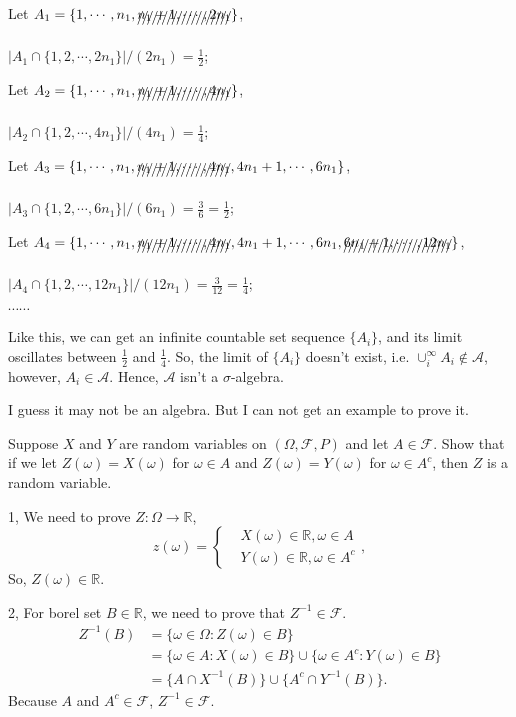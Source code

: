 \documentclass[en, normal, 11pt, black]{elegantnote}
\newenvironment{exercise}[1]{\begin{tcolorbox}[colback=black!15, colframe=black!80, breakable, title=#1]}{\end{tcolorbox}}
\renewenvironment{proof}{\begin{tcolorbox}[colback=white, colframe=black!50, breakable, title=Proof. ]\setlength{\parskip}{0.8em}}{\\\rightline{$\square$}\end{tcolorbox}}
\newenvironment{solution}{\begin{tcolorbox}[colback=white, colframe=black!50, breakable, title=Solution. ]\setlength{\parskip}{0.8em}}{\end{tcolorbox}}
\begin{document}
    \begin{solution}
        Let $A_1=\{1,\cdots,n_1, \xout{n_1+1, \cdots, 2n_1}\}$, 
        
        $|A_1 \cap\{1,2, \cdots, 2n_1\}| / (2n_1)=\frac{1}{2}$; 
        
        Let $A_2=\{1,\cdots,n_1,\xout{n_1+1, \cdots, 4n_1}\}$, 
        
        $|A_2 \cap\{1,2, \cdots, 4n_1\}| / (4n_1)=\frac{1}{4}$; 

        Let $A_3=\{1,\cdots,n_1,\xout{n_1+1, \cdots, 4n_1}, 4n_1+1, \cdots, 6n_1\}$, 
        
        $|A_3 \cap\{1,2, \cdots, 6n_1\}| / (6n_1)=\frac{3}{6}=\frac{1}{2}$; 

        Let $A_4=\{1,\cdots,n_1,\xout{n_1+1, \cdots, 4n_1}, 4n_1+1, \cdots, 6n_1,\xout{6n_1+1, \cdots, 12n_1}\}$, 
        
        $|A_4 \cap\{1,2, \cdots, 12n_1\}| / (12n_1)=\frac{3}{12}=\frac{1}{4}$; 

        $\cdots\cdots$

        Like this, we can get an infinite countable set sequence $\{A_i\}$, and its limit oscillates between $\frac{1}{2}$ and $\frac{1}{4}$. So, the limit of $\{A_i\}$ doesn't exist, i.e. $\cup_i^\infty A_i\not\in\mathcal{A}$, however, $A_i\in \mathcal{A}$. Hence, $\mathcal{A}$ isn't a $\sigma$-algebra. 

        I guess it may not be an algebra. But I can not get an example to prove it. 
    \end{solution}

    \begin{exercise}{1.2.1}
        Suppose $X$ and $Y$ are random variables on $(\Omega, \mathcal{F}, P)$ and let $A \in \mathcal{F}$. Show that if we let $Z(\omega)=X(\omega)$ for $\omega \in A$ and $Z(\omega)=Y(\omega)$ for $\omega \in A^{c}$, then $Z$ is a random variable.
    \end{exercise}
    \begin{proof}
        1, We need to prove $Z: \Omega\to\mathbb{R}$, 
        \begin{equation*}
            z(\omega)=\left\{
            \begin{aligned}
                &X(\omega)\in\mathbb{R}, \omega\in A\\
                &Y(\omega)\in\mathbb{R}, \omega\in A^c
            \end{aligned}
            \right., 
        \end{equation*}
        So, $Z(\omega)\in\mathbb{R}$. 

        2, For borel set $B\in\mathbb{R}$, we need to prove that $Z^{-1}\in\mathcal{F}$. 
        \begin{align*}
            Z^{-1}(B)&=\{\omega\in\Omega:Z(\omega)\in B\}\\
            &=\{\omega\in A: X(\omega)\in B\}\cup\{\omega\in A^c: Y(\omega)\in B\}\\
            &=\{A\cap X^{-1}(B)\}\cup\{A^c\cap Y^{-1}(B)\}. 
        \end{align*}
        Because $A$ and $A^c\in\mathcal{F}$, $Z^{-1}\in\mathcal{F}$. 
    \end{proof}
\end{document}
